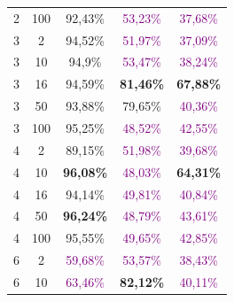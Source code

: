 \begin{table}[ht]
\begin{tabular}{cc|c|c|c}
        {2}                           & {100}     & {92,43\%}                           & \textcolor{purple}{53,23\%}         & \textcolor{purple}{37,68\%}              \\
        {3}                           & {2}       & {94,52\%}                           & \textcolor{purple}{51,97\%}         & \textcolor{purple}{37,09\%}              \\
        {3}                           & {10}      & {94,9\%}                            & \textcolor{purple}{53,47\%}         & \textcolor{purple}{38,24\%}              \\
        {3}                           & {16}      & {94,59\%}                           & \textbf{81,46\%}                    & \textbf{67,88\%}                         \\
        {3}                           & {50}      & {93,88\%}                           & {79,65\%}                           & \textcolor{purple}{40,36\%}              \\
        {3}                           & {100}     & {95,25\%}                           & \textcolor{purple}{48,52\%}         & \textcolor{purple}{42,55\%}              \\
        {4}                           & {2}       & {89,15\%}                           & \textcolor{purple}{51,98\%}         & \textcolor{purple}{39,68\%}              \\
        {4}                           & {10}      & \textbf{96,08\%}                    & \textcolor{purple}{48,03\%}         & \textbf{64,31\%}                         \\
        {4}                           & {16}      & {94,14\%}                           & \textcolor{purple}{49,81\%}         & \textcolor{purple}{40,84\%}              \\
        {4}                           & {50}      & \textbf{96,24\%}                    & \textcolor{purple}{48,79\%}         & \textcolor{purple}{43,61\%}              \\
        {4}                           & {100}     & {95,55\%}                           & \textcolor{purple}{49,65\%}         & \textcolor{purple}{42,85\%}              \\
        {6}                           & {2}       & \textcolor{purple}{59,68\%}         & \textcolor{purple}{53,57\%}         & \textcolor{purple}{38,43\%}              \\
        {6}                           & {10}      & \textcolor{purple}{63,46\%}         & \textbf{82,12\%}                    & \textcolor{purple}{40,11\%}              \\

\end{tabular}
\end{table}
